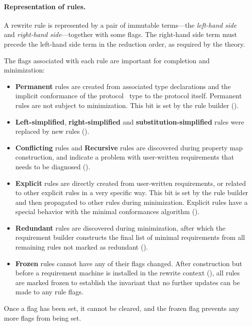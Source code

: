\documentclass[../generics]{subfiles}
\begin{document}
\paragraph{Representation of rules.}
%
A rewrite rule is represented by a pair of immutable terms---the \emph{left-hand side} and \emph{right-hand side}---together with some flags. The right-hand side term must precede the left-hand side term in the reduction order, as required by the theory.

The flags associated with each rule are important for completion and minimization:
\begin{itemize}
%
\item \textbf{Permanent} rules are created from associated type declarations and the implicit conformance of the protocol \tSelf\ type to the protocol itself. Permanent rules are not subject to minimization. This bit is set by the rule builder ().
%
%
%
\item \textbf{Left-simplified}, \textbf{right-simplified} and \textbf{substitution-simplified} rules were replaced by new rules ().
%
%
\item \textbf{Conflicting} rules and \textbf{Recursive} rules are discovered during property map construction, and indicate a problem with user-written requirements that needs to be diagnosed ().
%
\item \textbf{Explicit} rules are directly created from user-written requirements, or related to other explicit rules in a very specific way. This bit is set by the rule builder and then propagated to other rules during minimization. Explicit rules have a special behavior with the minimal conformances algorithm ().
%
\item \textbf{Redundant} rules are discovered during minimization, after which the requirement builder constructs the final list of minimal requirements from all remaining rules not marked as redundant ().
%
\item \textbf{Frozen} rules cannot have any of their flags changed. After construction but before a requirement machine is installed in the rewrite context (), all rules are marked frozen to establish the invariant that no further updates can be made to any rule flags.
\end{itemize}
Once a flag has been set, it cannot be cleared, and the frozen flag prevents any more flags from being set.
\end{document}
